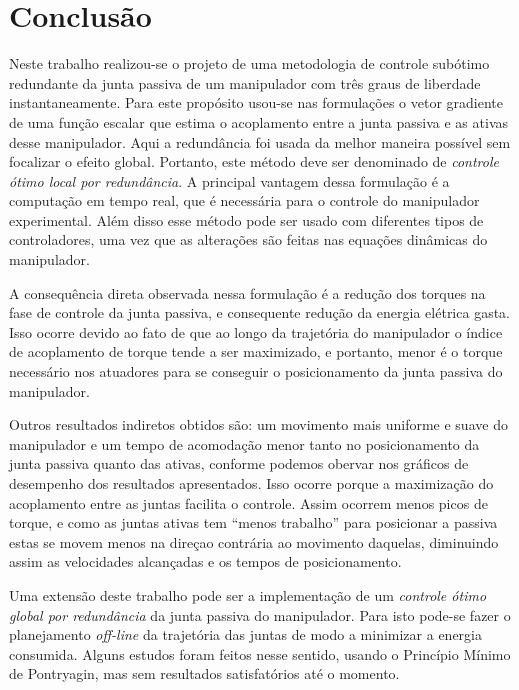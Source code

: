 \chapter{Conclusão}

Neste trabalho realizou-se o projeto de uma metodologia de controle subótimo redundante da junta passiva de um manipulador com três graus de liberdade instantaneamente. Para este propósito usou-se nas formulações o vetor gradiente de uma função escalar que estima o acoplamento entre a junta passiva e as ativas desse manipulador. Aqui a redundância
foi usada da melhor maneira possível sem focalizar o efeito global. Portanto, este método deve ser denominado de \emph{controle ótimo local por redundância}. A principal vantagem dessa formulação é a computação em tempo real, que é
necessária para o controle do manipulador experimental. Além disso esse método pode ser usado com diferentes tipos de controladores, uma vez que as alterações são feitas nas equações dinâmicas do manipulador.

A consequência direta observada nessa formulação é a redução dos torques na fase de controle da junta passiva, e consequente redução da energia elétrica gasta. Isso ocorre devido ao fato de que ao longo da trajetória do manipulador
o índice de acoplamento de torque tende a ser maximizado, e portanto, menor é o torque necessário nos atuadores para se conseguir o posicionamento da junta passiva do manipulador.

Outros resultados indiretos obtidos são: um movimento mais uniforme e suave do manipulador e um tempo de acomodação menor tanto no posicionamento da junta passiva quanto das ativas, conforme podemos obervar nos gráficos de desempenho dos resultados apresentados. Isso ocorre porque a maximização do acoplamento entre as juntas facilita o controle. Assim
ocorrem menos picos de torque, e como as juntas ativas tem ``menos trabalho'' para posicionar a passiva estas se movem menos na direçao contrária ao movimento daquelas, diminuindo assim as velocidades alcançadas e os tempos de posicionamento.

Uma extensão deste trabalho pode ser a implementação de um \emph{controle ótimo global por redundância} da junta passiva do manipulador. Para isto pode-se fazer o planejamento \emph{off-line} da trajetória das juntas de modo a minimizar a energia consumida. Alguns estudos foram feitos nesse sentido, usando o Princípio Mínimo de Pontryagin, mas sem resultados satisfatórios até o momento.
